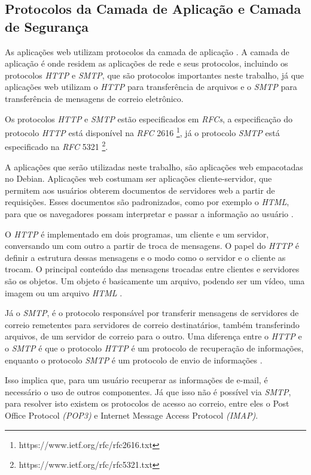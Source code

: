 \subsection{Protocolos da Camada de Aplicação e Camada de Segurança}

As aplicações web utilizam protocolos da camada de aplicação \cite{kurose2010redes}. 
A camada de aplicação é onde residem as 
aplicações de rede e seus protocolos, incluindo os protocolos \textit{HTTP} e 
\textit{SMTP}, que são protocolos importantes neste trabalho, já que 
aplicações web utilizam o \textit{HTTP} para transferência de arquivos e o \textit{SMTP} para
transferência de mensagens de correio eletrônico. 

Os protocolos \textit{HTTP} e \textit{SMTP} estão especificados em \textit{RFCs}, a 
especificação do protocolo \textit{HTTP} está disponível na \textit{RFC} 2616 
\footnote{https://www.ietf.org/rfc/rfc2616.txt}, já o protocolo \textit{SMTP} 
está especificado na \textit{RFC} 5321 \footnote{https://www.ietf.org/rfc/rfc5321.txt}.

A aplicações que serão utilizadas neste trabalho, são aplicações web empacotadas no
Debian. Aplicações web costumam ser aplicações cliente-servidor, que permitem aos
usuários obterem documentos de servidores web a partir de requisições. Esses documentos são padronizados, como por exemplo o \textit{HTML}, 
para que os navegadores possam interpretar e passar a informação ao usuário 
\cite{kurose2010redes}.

O \textit{HTTP} é 
implementado em dois programas, um cliente e um servidor, conversando um 
com outro a partir de troca de mensagens. O papel do \textit{HTTP} é definir a 
estrutura dessas mensagens e o modo como o servidor e o cliente as trocam. O 
principal conteúdo das mensagens trocadas entre clientes e servidores são os 
objetos. Um objeto é basicamente um arquivo, podendo ser um vídeo, uma imagem 
ou um arquivo \textit{HTML} \cite{kurose2010redes}.

Já o \textit{SMTP}, é o protocolo responsável por transferir mensagens de servidores de correio
remetentes para servidores de correio destinatários, também transferindo arquivos,
de um servidor de correio para o outro. Uma diferença entre o \textit{HTTP} e o \textit{SMTP}
é que o protocolo \textit{HTTP} é um protocolo de recuperação de informações, enquanto
o protocolo \textit{SMTP} é um protocolo de envio de informações \cite{kurose2010redes}. 

Isso implica que, para um usuário recuperar as informações de e-mail, é necessário 
o uso de outros componentes. Já que isso não é possível via \textit{SMTP}, para 
resolver isto existem os protocolos de acesso ao correio, entre eles o 
Post Office Protocol \textit{(POP3)} e Internet Message Access Protocol \textit{(IMAP)}.

